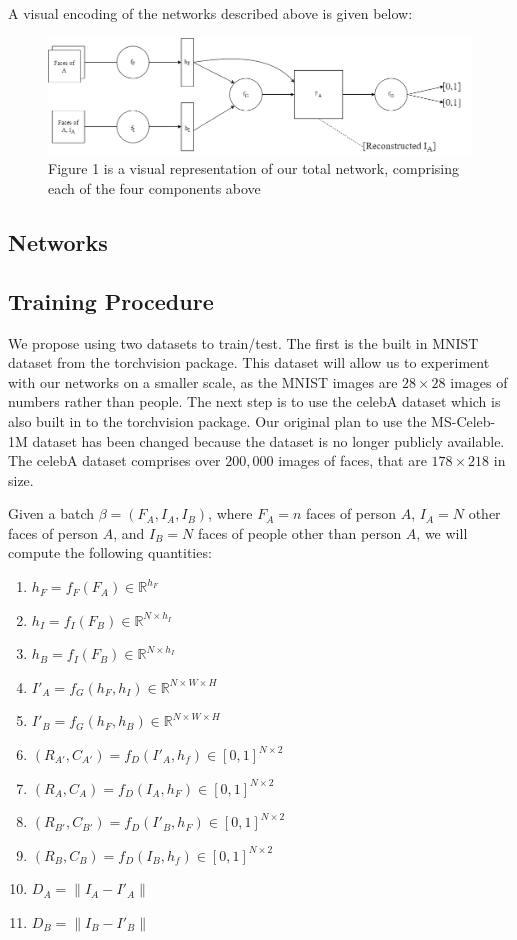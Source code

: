 \documentclass{article}
\begin{document}
A visual encoding of the networks described above is given below:
\begin{figure}[hbt]
	\centering
	\includegraphics[scale=0.25]{images/OurNetwork.png}
	\caption{Figure 1 is a visual representation of our total network, comprising each of the four components above}
	\label{fig:my_label}
\end{figure}

\subsection{Networks}

\subsection{Training Procedure}

We propose using two datasets to train/test. The first is the built in MNIST dataset from the torchvision package. This dataset will allow us to experiment with our networks on a smaller scale, as the MNIST images are $28 \times 28$ images of numbers rather than people. The next step is to use the celebA dataset which is also built in to the torchvision package. Our original plan to use the MS-Celeb-1M dataset \cite{guo2016ms}
has been changed because the dataset is no longer publicly available. The celebA dataset comprises over $200,000$ images of faces, that are $178 \times 218$ in size.

Given a batch $\beta = (F_A, I_A, I_B)$, where $F_A = n$ faces of person $A$, $I_A = N$ other faces of person $A$, and $I_B = N $ faces of people other than person $A$, we will compute the following quantities:
\begin{enumerate}
	\item $h_F = f_F(F_A) \in \mathbb{R}^{h_F}$
	\item $h_I = f_I(F_B) \in \mathbb{R}^{N \times h_I}$
	\item $h_B = f_I(F_B) \in \mathbb{R}^{N \times h_I}$
	\item $I'_A = f_G(h_F, h_I) \in \mathbb{R}^{N \times W \times H}$
	\item $I'_B = f_G(h_F, h_B) \in \mathbb{R}^{N \times W \times H}$
	\item $(R_{A'}, C_{A'}) = f_D(I'_A, h_f) \in [0,1]^{N \times 2}$
	\item $(R_A, C_A) = f_D(I_A, h_F) \in [0,1]^{N \times 2}$
	\item $(R_{B'}, C_{B'}) = f_D(I'_B, h_F) \in [0,1]^{N \times 2}$
	\item $(R_B, C_B) = f_D(I_B, h_f) \in [0,1]^{N \times 2}$
	\item $D_A = \|I_A - I'_A\|$
	\item $D_B = \|I_B - I'_B\|$
\end{enumerate}
\end{document}

